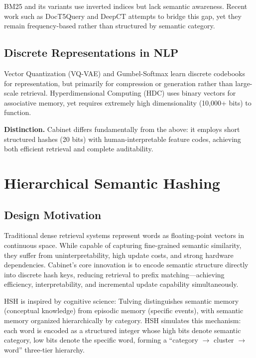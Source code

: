\documentclass[11pt,a4paper]{article}
\theoremstyle{definition}
\begin{document}
BM25 \cite{robertson2009probabilistic} and its variants use inverted indices but lack semantic awareness. Recent work such as DocT5Query and DeepCT attempts to bridge this gap, yet they remain frequency-based rather than structured by semantic category.

\subsection{Discrete Representations in NLP}

Vector Quantization (VQ-VAE) \cite{van2017neural} and Gumbel-Softmax \cite{jang2016categorical} learn discrete codebooks for representation, but primarily for compression or generation rather than large-scale retrieval. Hyperdimensional Computing (HDC) \cite{kanerva2009hyperdimensional} uses binary vectors for associative memory, yet requires extremely high dimensionality (10,000+ bits) to function.

\textbf{Distinction.} Cabinet differs fundamentally from the above: it employs short structured hashes (20 bits) with human-interpretable feature codes, achieving both efficient retrieval and complete auditability.

\section{Hierarchical Semantic Hashing}
\label{sec:hsh}

\subsection{Design Motivation}

Traditional dense retrieval systems represent words as floating-point vectors in continuous space. While capable of capturing fine-grained semantic similarity, they suffer from uninterpretability, high update costs, and strong hardware dependencies. Cabinet's core innovation is to encode semantic structure directly into discrete hash keys, reducing retrieval to prefix matching---achieving efficiency, interpretability, and incremental update capability simultaneously.

HSH is inspired by cognitive science: Tulving \cite{tulving1985memory} distinguishes semantic memory (conceptual knowledge) from episodic memory (specific events), with semantic memory organized hierarchically by category. HSH simulates this mechanism: each word is encoded as a structured integer whose high bits denote semantic category, low bits denote the specific word, forming a ``category $\rightarrow$ cluster $\rightarrow$ word'' three-tier hierarchy.
\end{document}
